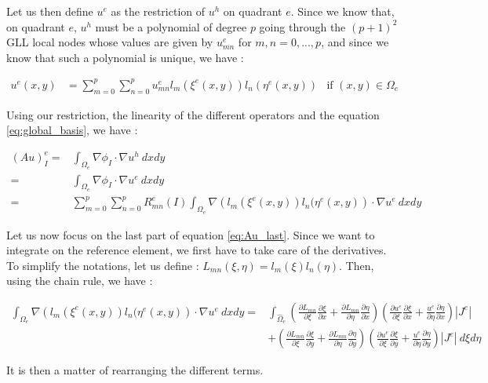 Let us then define $u^e$ as the restriction of $u^h$ on quadrant $e$. Since we know that, on quadrant $e$, $u^h$ must be a polynomial of degree $p$ going through the $(p+1)^2$ GLL local nodes whose values are given by $u_{mn}^e$ for $m,n=0,...,p$, and since we know that such a polynomial is unique, we have : 

\begin{align*}
u^e(x,y) &= \sum_{m=0}^p \sum_{n=0}^p u^e_{mn}l_m(\xi^e(x,y))l_n(\eta^e(x,y)) &\text{if $(x,y)\in \Omega_e$}
\end{align*}

Using our restriction, the linearity of the different operators and the equation \ref{eq:global_basis}, we have :  

\begin{align}
(Au)_I^e =& \int_{\Omega_e} \nabla \phi_I \cdot \nabla u^h\: dxdy \nonumber\\
=& \int_{\Omega_e} \nabla \phi_I \cdot \nabla u^e\: dxdy \nonumber\\
=& \sum_{m=0}^p\sum_{n=0}^p R^e_{mn}(I) \int_{\Omega_e} \nabla \left( l_m(\xi^e(x,y))l_n(\eta^e(x,y)\right) \cdot \nabla u^e \: dxdy \label{eq:Au_last}
\end{align}

Let us now focus on the last part of equation \ref{eq:Au_last}. Since we want to integrate on the reference element, we first have to take care of the derivatives. To simplify the notations, let us define : $L_{mn}(\xi,\eta) = l_m(\xi)l_n(\eta)$. Then, using the chain rule, we have : 

\begin{align*}
\int_{\Omega_e} \nabla \left( l_m(\xi^e(x,y))l_n(\eta^e(x,y)\right) \cdot \nabla u^e \: dxdy = &\int_{\hat{\Omega}_e} \left(\frac{\partial L_{mn}}{\partial\xi}\frac{\partial\xi}{\partial x}+\frac{\partial L_{mn}}{\partial\eta}\frac{\partial\eta}{\partial x}\right)\left(\frac{\partial u^e}{\partial\xi}\frac{\partial\xi}{\partial x}+\frac{u^e}{\partial\eta}\frac{\partial\eta}{\partial x}\right) |J^e|\\
&+  \left(\frac{\partial L_{mn}}{\partial\xi}\frac{\partial\xi}{\partial y}+\frac{\partial L_{mn}}{\partial\eta}\frac{\partial\eta}{\partial y}\right)\left(\frac{\partial u^e}{\partial\xi}\frac{\partial\xi}{\partial y}+\frac{u^e}{\partial\eta}\frac{\partial\eta}{\partial y}\right)|J^e| \: d\xi d\eta 
\end{align*}

It is then a matter of rearranging the different terms. 

